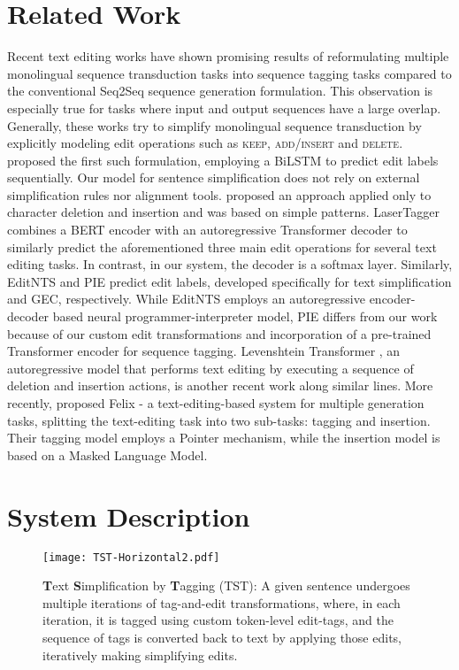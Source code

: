 \documentclass[11pt,a4paper]{article}
\begin{document}
\section{Related Work}
Recent text editing works have shown promising results of reformulating multiple monolingual sequence transduction tasks into sequence tagging tasks compared to the conventional Seq2Seq sequence generation formulation. This observation is especially true for tasks where input and output sequences have a large overlap. 
Generally, these works try to simplify monolingual sequence transduction by explicitly modeling edit operations such as \textsc{keep}, \textsc{add}/\textsc{insert} and \textsc{delete}. \citet{alva-manchego-etal-2017-learning} proposed the first such formulation, employing a BiLSTM to predict edit labels sequentially. Our model for sentence simplification does not rely on external simplification rules nor alignment tools. \citet{ribeiro-etal-2018-local} proposed an approach applied only to character deletion and insertion and was based on simple patterns. LaserTagger \cite{malmi-etal-2019-encode} combines a BERT encoder with an autoregressive Transformer decoder to similarly predict the aforementioned three main edit operations for several text editing tasks. In contrast, in our system, the decoder is a softmax layer. Similarly, EditNTS \cite{dong-etal-2019-editnts} and PIE \cite{awasthi-etal-2019-parallel} predict edit labels, developed specifically for text simplification and GEC, respectively. While EditNTS employs an autoregressive encoder-decoder based neural programmer-interpreter model, PIE differs from our work because of our custom edit transformations and incorporation of a pre-trained Transformer encoder for sequence tagging. Levenshtein Transformer \cite{NIPS2019_9297}, an autoregressive model that performs text editing by executing a sequence of deletion and insertion actions, is another recent work along similar lines. More recently, \citet{mallinson2020felix} proposed Felix - a text-editing-based system for multiple generation tasks, splitting the text-editing task into two sub-tasks: tagging and insertion. Their tagging model employs a Pointer mechanism, while the insertion model is based on a Masked Language Model. 


\section{System Description}

\begin{figure}
    \centering
    \texttt{[image: TST-Horizontal2.pdf]}
    \caption{\textbf{T}ext \textbf{S}implification by \textbf{T}agging (TST): A given sentence undergoes multiple iterations of tag-and-edit transformations, where, in each iteration, it is tagged using custom token-level edit-tags, and the sequence of tags is converted back to text by applying those edits, iteratively making simplifying edits.}
    \label{fig:framework}
\end{figure}
\end{document}
